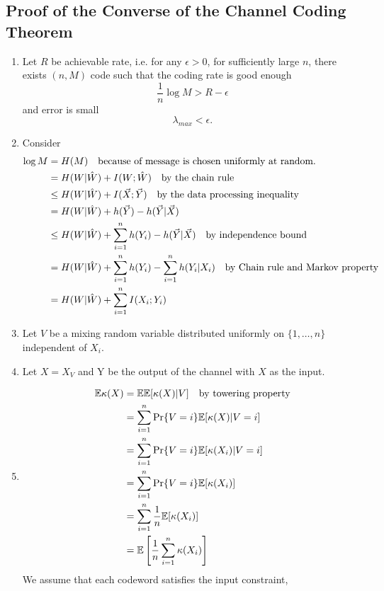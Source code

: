 \documentclass[../main.tex]{subfiles}
\begin{document}
\subsection{Proof of the Converse of the Channel Coding Theorem}
\begin{enumerate}
    \item Let $R$ be achievable rate, i.e. for any $\epsilon >0$, for sufficiently large $n$, there exists $(n,M)$ code such that the coding rate is good enough
    \[
        \frac{1}{n}\log M > R-\epsilon
    \] and error is small
    \[
    \lambda_{max} < \epsilon.
    \]
    \item Consider \begin{align*}
        \log M &= H(M) \quad \text{because of message is chosen uniformly at random.}\\
        &= H(W|\hat W) + I(W;\hat W) \quad \text{by the chain rule}\\
        &\leq H(W|\hat W) + I(\vec X;\vec Y) \quad \text{by the data processing inequality}\\
        &= H(W|\hat W) + h(\vec Y) - h(\vec Y|\vec X)\\
        &\leq H(W|\hat W) + \sum_{i=1}^n h(Y_i) - h(\vec Y|\vec X) \quad \text{by independence bound}\\
        &= H(W|\hat W) + \sum_{i=1}^nh(Y_i) - \sum_{i=1}^n h(Y_i|X_i) \quad \text{by Chain rule and Markov property}\\
        &= H(W|\hat W) + \sum_{i=1}^n I(X_i;Y_i)
    \end{align*}
    \item Let $V$ be a mixing random variable distributed uniformly on $\{1,\dots,n\}$ independent of $X_i$.
    \item Let $X=X_V$ and Y be the output of the channel with $X$ as the input.
    \item \begin{align*}
        \mathbb{E} \kappa(X) &= \mathbb{E} \mathbb{E}[\kappa(X)|V] \quad\text{by towering property}\\
        &=\sum_{i=1}^n \Pr\{V=i\}\mathbb{E} [\kappa(X)|V=i]\\
        &=\sum_{i=1}^n \Pr\{V=i\}\mathbb{E} [\kappa(X_i)|V=i]\\
        &=\sum_{i=1}^n \Pr\{V=i\}\mathbb{E} [\kappa(X_i)]\\
        &=\sum_{i=1}^n \frac{1}{n}\mathbb{E} [\kappa(X_i)]\\
        &=\mathbb{E} \left[\frac{1}{n}\sum_{i=1}^n \kappa(X_i)\right]
    \end{align*}
    We assume that each codeword satisfies the input constraint, \[
\]
\end{enumerate}
\end{document}
